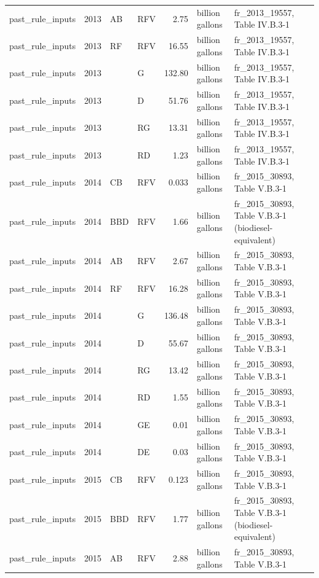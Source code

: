 \begin{longtable}{p{2.3cm}p{0.7cm}p{1.0cm}p{2.6cm}rp{1.7cm}p{4.6cm}}
past\_rule\_inputs & 2013 & AB & RFV & 2.75 & billion gallons & fr\_2013\_19557, Table IV.B.3-1 \\
past\_rule\_inputs & 2013 & RF & RFV & 16.55 & billion gallons & fr\_2013\_19557, Table IV.B.3-1 \\
past\_rule\_inputs & 2013 &  & G & 132.80 & billion gallons & fr\_2013\_19557, Table IV.B.3-1 \\
past\_rule\_inputs & 2013 &  & D & 51.76 & billion gallons & fr\_2013\_19557, Table IV.B.3-1 \\
past\_rule\_inputs & 2013 &  & RG & 13.31 & billion gallons & fr\_2013\_19557, Table IV.B.3-1 \\
past\_rule\_inputs & 2013 &  & RD & 1.23 & billion gallons & fr\_2013\_19557, Table IV.B.3-1 \\
past\_rule\_inputs & 2014 & CB & RFV & 0.033 & billion gallons & fr\_2015\_30893, Table V.B.3-1 \\
past\_rule\_inputs & 2014 & BBD & RFV & 1.66 & billion gallons & fr\_2015\_30893, Table V.B.3-1 (biodiesel-equivalent) \\
past\_rule\_inputs & 2014 & AB & RFV & 2.67 & billion gallons & fr\_2015\_30893, Table V.B.3-1 \\
past\_rule\_inputs & 2014 & RF & RFV & 16.28 & billion gallons & fr\_2015\_30893, Table V.B.3-1 \\
past\_rule\_inputs & 2014 &  & G & 136.48 & billion gallons & fr\_2015\_30893, Table V.B.3-1 \\
past\_rule\_inputs & 2014 &  & D & 55.67 & billion gallons & fr\_2015\_30893, Table V.B.3-1 \\
past\_rule\_inputs & 2014 &  & RG & 13.42 & billion gallons & fr\_2015\_30893, Table V.B.3-1 \\
past\_rule\_inputs & 2014 &  & RD & 1.55 & billion gallons & fr\_2015\_30893, Table V.B.3-1 \\
past\_rule\_inputs & 2014 &  & GE & 0.01 & billion gallons & fr\_2015\_30893, Table V.B.3-1 \\
past\_rule\_inputs & 2014 &  & DE & 0.03 & billion gallons & fr\_2015\_30893, Table V.B.3-1 \\
past\_rule\_inputs & 2015 & CB & RFV & 0.123 & billion gallons & fr\_2015\_30893, Table V.B.3-1 \\
past\_rule\_inputs & 2015 & BBD & RFV & 1.77 & billion gallons & fr\_2015\_30893, Table V.B.3-1 (biodiesel-equivalent) \\
past\_rule\_inputs & 2015 & AB & RFV & 2.88 & billion gallons & fr\_2015\_30893, Table V.B.3-1 \\

\end{longtable}
